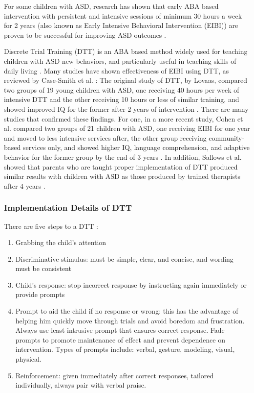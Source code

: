 For some children with ASD, research has shown that early ABA based intervention with persistent and intensive sessions of minimum 30 hours a week for 2 years (also known as Early Intensive Behavioral Intervention (EIBI)) are proven to be successful for improving ASD outcomes \cite{howlin2009systematic}.

Discrete Trial Training (DTT) is an ABA based method widely used for teaching children with ASD new behaviors, and particularly useful in teaching skills of daily living \cite{smith2001discrete}.  Many studies have shown effectiveness of EIBI using DTT, as reviewed by Case-Smith et al. \cite{case2008evidence}: The original study of DTT, by Lovaas, compared two groups of 19 young children with ASD, one receiving 40 hours per week of intensive DTT and the other receiving 10 hours or less of similar training, and showed improved IQ for the former after 2 years of intervention \cite{lovaas1987behavioral}.  There are many studies that confirmed these findings.  For one, in a more recent study, Cohen et al. compared two groups of 21 children with ASD, one receiving EIBI for one year and moved to less intensive services after, the other group receiving community-based services only, and showed higher IQ, language comprehension, and adaptive behavior for the former group by the end of 3 years \cite{cohen2006early}.  In addition, Sallows et al. showed that parents who are taught proper implementation of DTT produced similar results with children with ASD as those produced by trained therapists after 4 years \cite{sallows2005intensive}.

\subsubsection{Implementation Details of DTT}
There are five steps to a DTT \cite{bogin2010steps}:
\begin{enumerate}
	\item Grabbing the child's attention
	\item Discriminative stimulus: must be simple, clear, and concise, and wording must be consistent
	\item Child's response: stop incorrect response by instructing again immediately or provide prompts
	\item Prompt to aid the child if no response or wrong: this has the advantage of helping him quickly move through trials and avoid boredom and frustration.  Always use least intrusive prompt that ensures correct response.  Fade prompts to promote maintenance of effect and prevent dependence on intervention.  Types of prompts include: verbal, gesture, modeling, visual, physical.
	\item Reinforcement: given immediately after correct responses, tailored individually, always pair with verbal praise.
\end{enumerate}

